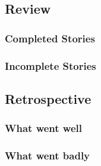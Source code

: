 \subsection{Review}
\subsubsection{Completed Stories}
\subsubsection{Incomplete Stories}

\subsection{Retrospective}
\subsubsection{What went well}

\subsubsection{What went badly}

\newpage
